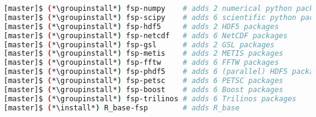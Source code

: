 \begin{lstlisting}[language=bash,keywords={},upquote=true,keepspaces]
[master]$ (*\groupinstall*) fsp-numpy    # adds 2 numerical python packages
[master]$ (*\groupinstall*) fsp-scipy    # adds 6 scientific python packages
[master]$ (*\groupinstall*) fsp-hdf5     # adds 2 HDF5 packages
[master]$ (*\groupinstall*) fsp-netcdf   # adds 6 NetCDF packages
[master]$ (*\groupinstall*) fsp-gsl      # adds 2 GSL packages
[master]$ (*\groupinstall*) fsp-metis    # adds 2 METIS packages
[master]$ (*\groupinstall*) fsp-fftw     # adds 6 FFTW packages
[master]$ (*\groupinstall*) fsp-phdf5    # adds 6 (parallel) HDF5 packages
[master]$ (*\groupinstall*) fsp-petsc    # adds 6 PETSC packages
[master]$ (*\groupinstall*) fsp-boost    # adds 6 Boost packages
[master]$ (*\groupinstall*) fsp-trilinos # adds 6 Trilinos packages
[master]$ (*\install*) R_base-fsp        # adds R_base 
\end{lstlisting}
